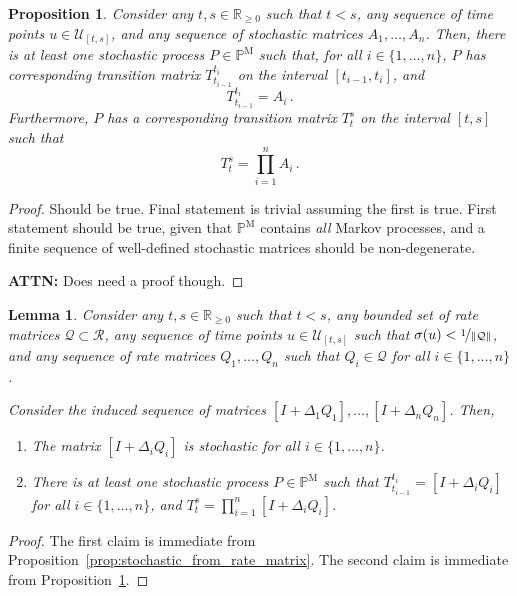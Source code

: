 \documentclass[10pt]{paper}
\newtheorem{proposition}[theorem]{Proposition}
\newtheorem{lemma}[theorem]{Lemma}
\newcommand{\reals}{\mathbb{R}}
\newcommand{\realsnonneg}{\reals_{\geq 0}}
\newcommand{\processes}{\mathbb{P}}
\newcommand{\mprocesses}{\processes^{\mathrm{M}}}
\newcommand{\norm}[1]{\left\lVert #1 \right\rVert}
\begin{document}
\begin{proposition}\label{prop:transitionmatrix_factorized_has_process}
Consider any $t,s\in\realsnonneg$ such that $t<s$, any sequence of time points $u\in\mathcal{U}_{[t,s]}$, and any sequence of stochastic matrices $A_1,\ldots,A_n$. Then, there is at least one stochastic process $P\in\mprocesses$ such that, for all $i\in\{1,\ldots,n\}$, $P$ has corresponding transition matrix $T_{t_{i-1}}^{t_i}$ on the interval $[t_{i-1},t_i]$, and
\begin{equation*}
T_{t_{i-1}}^{t_i} = A_i\,.
\end{equation*}
Furthermore, $P$ has a corresponding transition matrix $T_t^s$ on the interval $[t,s]$ such that
\begin{equation*}
T_t^s = \prod_{i=1}^n A_i\,.
\end{equation*}
\end{proposition}
\begin{proof}
Should be true. Final statement is trivial assuming the first is true. First statement should be true, given that $\mprocesses$ contains \emph{all} Markov processes, and a finite sequence of well-defined stochastic matrices should be non-degenerate.

{\bf ATTN:} Does need a proof though.
\end{proof}

\begin{lemma}\label{lemma:linear_factorization_has_process}
Consider any $t,s\in\realsnonneg$ such that $t<s$, any bounded set of rate matrices $\mathcal{Q}\subset\mathcal{R}$, any sequence of time points $u\in\mathcal{U}_{[t,s]}$ such that $\sigma(u)<\nicefrac{1}{\norm{\mathcal{Q}}}$, and any sequence of rate matrices $Q_1,\ldots,Q_n$ such that $Q_i\in\mathcal{Q}$ for all $i\in\{1,\ldots,n\}$. 

Consider the induced sequence of matrices $[I + \Delta_1 Q_1],\ldots,[I+\Delta_n Q_n]$. Then,
\begin{enumerate}
\item The matrix $[I+\Delta_i Q_i]$ is stochastic for all $i\in\{1,\ldots,n\}$.
\item There is at least one stochastic process $P\in\mprocesses$ such that $T_{t_{i-1}}^{t_i}=[I+\Delta_i Q_i]$ for all $i\in\{1,\ldots,n\}$, and $T_t^s = \prod_{i=1}^n[I+\Delta_i Q_i]$.
\end{enumerate}
\end{lemma}
\begin{proof}
The first claim is immediate from Proposition~\ref{prop:stochastic_from_rate_matrix}. The second claim is immediate from Proposition~\ref{prop:transitionmatrix_factorized_has_process}.
\end{proof}
\end{document}
